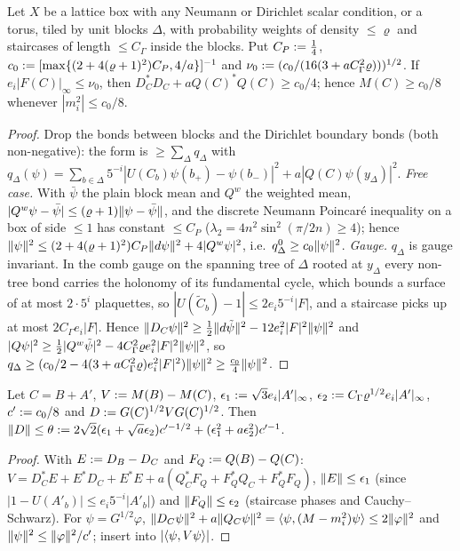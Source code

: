 \begin{lemma}\label{lem:a02:COER}
Let $X$ be a lattice box with any Neumann or Dirichlet scalar condition, or a torus, tiled by unit blocks $\Delta$, with probability weights of density $\le\varrho$ and staircases of length $\le C_\Gamma$ inside the blocks. Put $C_P:=\frac14$, $c_0:=[\max\{(2+4(\varrho+1)^2)C_P,4/a\}]^{-1}$ and $\nu_0:=(c_0/(16(3+aC_\Gamma^2\varrho)))^{1/2}$. If $e_i|F(C)|_\infty\le\nu_0$, then $D_C^*D_C+aQ(C)^*Q(C)\ge c_0/4$; hence $M(C)\ge c_0/8$ whenever $|m_i^2|\le c_0/8$.
\end{lemma}
\begin{proof}
Drop the bonds between blocks and the Dirichlet boundary bonds (both non-negative): the form is $\ge\sum_\Delta q_\Delta$ with $q_\Delta(\psi)=\sum_{b\in\Delta}5^{-i}|U(C_b)\psi(b_+)-\psi(b_-)|^2+a|Q(C)\psi(y_\Delta)|^2$. \emph{Free case.} With $\bar\psi$ the plain block mean and $Q^w$ the weighted mean, $|Q^w\psi-\bar\psi|\le(\varrho+1)\lVert \psi-\bar\psi\rVert$, and the discrete Neumann Poincar\'e inequality on a box of side $\le1$ has constant $\le C_P$ ($\lambda_2=4n^2\sin^2(\pi/2n)\ge4$); hence $\lVert \psi\rVert^2\le(2+4(\varrho+1)^2)C_P\lVert d\psi\rVert^2+4|Q^w\psi|^2$, i.e.\ $q^0_\Delta\ge c_0\lVert \psi\rVert^2$. \emph{Gauge.} $q_\Delta$ is gauge invariant. In the comb gauge on the spanning tree of $\Delta$ rooted at $y_\Delta$ every non-tree bond carries the holonomy of its fundamental cycle, which bounds a surface of at most $2\cdot5^{i}$ plaquettes, so $|U(\tilde C_b)-1|\le2e_i5^{-i}|F|$, and a staircase picks up at most $2C_\Gamma e_i|F|$. Hence $\lVert D_C\psi\rVert^2\ge\frac12\lVert d\tilde\psi\rVert^2-12e_i^2|F|^2\lVert \psi\rVert^2$ and $|Q\psi|^2\ge\frac12|Q^w\tilde\psi|^2-4C_\Gamma^2\varrho e_i^2|F|^2\lVert \psi\rVert^2$, so $q_\Delta\ge(c_0/2-4(3+aC_\Gamma^2\varrho)e_i^2|F|^2)\lVert \psi\rVert^2\ge\frac{c_0}4\lVert \psi\rVert^2$.
\end{proof}

\begin{lemma}\label{lem:a02:V}
Let $C=B+A'$, $V:= M(B)-M(C)$, $\epsilon_1:=\sqrt3e_i|A'|_\infty$, $\epsilon_2:= C_\Gamma\varrho^{1/2}e_i|A'|_\infty$, $c':= c_0/8$ and $D:= G(C)^{1/2}VG(C)^{1/2}$. Then $\lVert D\rVert\le\theta:=2\sqrt2(\epsilon_1+\sqrt a\epsilon_2)c'^{-1/2}+(\epsilon_1^2+a\epsilon_2^2)c'^{-1}$.
\end{lemma}
\begin{proof}
With $E:= D_B-D_C$ and $F_Q:= Q(B)-Q(C)$: $V=D_C^*E+E^*D_C+E^*E+a(Q_C^*F_Q+F_Q^*Q_C+F_Q^*F_Q)$, $\lVert E\rVert\le\epsilon_1$ (since $|1-U(A'_b)|\le e_i5^{-i}|A'_b|$) and $\lVert F_Q\rVert\le\epsilon_2$ (staircase phases and Cauchy--Schwarz). For $\psi=G^{1/2}\varphi$, $\lVert D_C\psi\rVert^2+a\lVert Q_C\psi\rVert^2=\langle \psi,(M-m_i^2)\psi\rangle\le2\lVert \varphi\rVert^2$ and $\lVert \psi\rVert^2\le\lVert \varphi\rVert^2/c'$; insert into $|\langle \psi,V\psi\rangle|$.
\end{proof}

